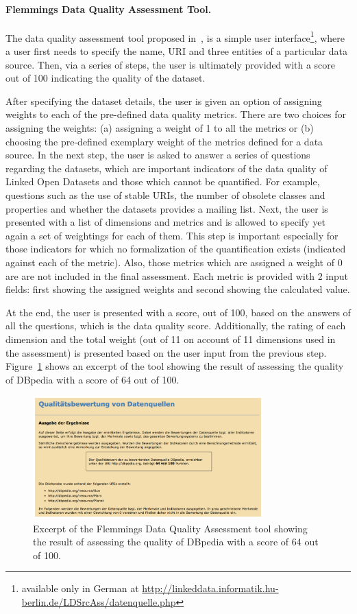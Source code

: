 \paragraph{Flemmings Data Quality Assessment Tool.}
The data quality assessment tool proposed in~\cite{Flemming}, is a simple user interface\footnote{available only in German at \url{http://linkeddata.informatik.hu-berlin.de/LDSrcAss/datenquelle.php}}, where a user first needs to specify the name, URI and three entities of a particular data source. 
Then, via a series of steps, the user is ultimately provided with a score out of 100 indicating the quality of the dataset. 

After specifying the dataset details, the user is given an option of assigning weights to each of the pre-defined data quality metrics. 
There are two choices for assigning the weights: (a) assigning a weight of 1 to all the metrics or (b) choosing the pre-defined exemplary weight of the metrics defined for a data source.
In the next step, the user is asked to answer a series of questions regarding the datasets, which are important indicators of the data quality of Linked Open Datasets and those which cannot be quantified. 
For example, questions such as the use of stable URIs, the number of obsolete classes and properties and whether the datasets provides a mailing list. 
Next, the user is presented with a list of dimensions and metrics and is allowed to specify yet again a set of weightings for each of them.
This step is important especially for those indicators for which no formalization of the quantification exists (indicated against each of the metric). 
Also, those metrics which are assigned a weight of 0 are are not included in the final assessment.
Each metric is provided with 2 input fields: first showing the assigned weights and second showing the calculated value. 

At the end, the user is presented with a score, out of 100, based on the answers of all the questions, which is the data quality score.
Additionally, the rating of each dimension and the total weight (out of 11 on account of 11 dimensions used in the assessment) is presented based on the user input from the previous step. 
Figure~\ref{fig:flemmingtool} shows an excerpt of the tool showing the result of assessing the quality of DBpedia with a score of 64 out of 100. 

\begin{figure}[htb]
\includegraphics[width=3.5in]{Flemmingtool.pdf}
\caption{Excerpt of the Flemmings Data Quality Assessment tool showing the result of assessing the quality of DBpedia with a score of 64 out of 100.}
\label{fig:flemmingtool}
\end{figure}

